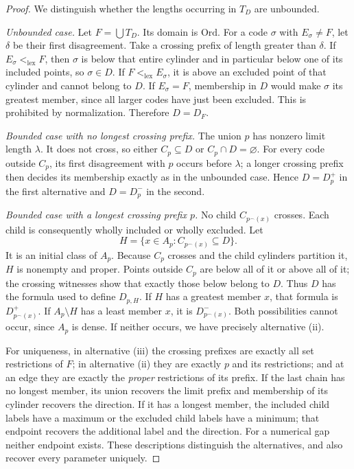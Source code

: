 \documentclass[11pt]{article}
\theoremstyle{definition}
\theoremstyle{remark}
\newcommand{\Ord}{\mathrm{Ord}}
\newcommand{\lex}{\mathrm{lex}}
\newcommand{\cat}{\mathbin{{}^\frown}}
\begin{document}
\begin{proof}
We distinguish whether the lengths occurring in $T_D$ are unbounded.

\emph{Unbounded case.} Let $F=\bigcup T_D$. Its domain is $\Ord$.
For a code $\sigma$ with $E_\sigma\ne F$, let $\delta$ be their first
disagreement. Take a crossing prefix of length greater than $\delta$.
If $E_\sigma <_{\lex} F$, then $\sigma$ is below that entire cylinder and
in particular below one of its included points, so $\sigma\in D$.
If $F<_{\lex} E_\sigma$, it is above an excluded point of that cylinder
and cannot belong to $D$. If $E_\sigma=F$, membership in $D$ would make
$\sigma$ its greatest member, since all larger codes have just been
excluded. This is prohibited by normalization. Therefore $D=D_F$.

\emph{Bounded case with no longest crossing prefix.} The union $p$ has
nonzero limit length $\lambda$. It does not cross, so either
$C_p\subseteq D$ or $C_p\cap D=\varnothing$. For every code outside
$C_p$, its first disagreement with $p$ occurs before $\lambda$; a
longer crossing prefix then decides its membership exactly as in the
unbounded case. Hence $D=D_p^+$ in the first alternative and $D=D_p^-$
in the second.

\emph{Bounded case with a longest crossing prefix $p$.} No child
$C_{p\cat(x)}$ crosses. Each child is consequently wholly included or
wholly excluded. Let
\[
 H=\{x\in A_p:C_{p\cat(x)}\subseteq D\}.
\]
It is an initial class of $A_p$. Because $C_p$ crosses and the child
cylinders partition it, $H$ is nonempty and proper. Points outside
$C_p$ are below all of it or above all of it; the crossing witnesses
show that exactly those below belong to $D$. Thus $D$ has the formula
used to define $D_{p,H}$. If $H$ has a greatest member $x$, that formula
is $D_{p\cat(x)}^+$. If $A_p\setminus H$ has a least member $x$, it
is $D_{p\cat(x)}^-$. Both possibilities cannot occur, since $A_p$ is
dense. If neither occurs, we have precisely alternative (ii).

For uniqueness, in alternative (iii) the crossing prefixes are exactly
all set restrictions of $F$; in alternative (ii) they are exactly $p$
and its restrictions; and at an edge they are exactly the \emph{proper}
restrictions of its prefix. If the last chain has no longest member,
its union recovers the limit prefix and membership of its cylinder
recovers the direction. If it has a longest member, the included child
labels have a maximum or the excluded child labels have a minimum;
that endpoint recovers the additional label and the direction. For a
numerical gap neither endpoint exists. These descriptions distinguish
the alternatives, and also recover every parameter uniquely.
\end{proof}
\end{document}
